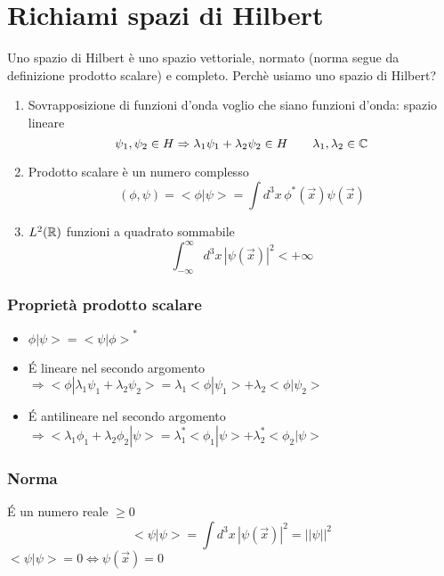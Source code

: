 \chapter{Richiami spazi di Hilbert}

Uno spazio di Hilbert è uno spazio vettoriale, normato (norma segue da definizione prodotto scalare) e completo. Perchè usiamo uno spazio di Hilbert?
\begin{enumerate}
    \item Sovrapposizione di funzioni d'onda voglio che siano funzioni d'onda: spazio lineare
    \begin{equation*}
        \psi_1,\psi_2 \in H \Rightarrow \lambda_1\psi_1 + \lambda_2\psi_2 \in H \qquad \lambda_1,\lambda_2 \in \mathbb{C} 
    \end{equation*}
    \item Prodotto scalare è un numero complesso
    \begin{equation*}
        (\phi,\psi) = <\phi | \psi> = \int d^3x \, \phi^*(\vec{x})\psi(\vec{x})
    \end{equation*}
    \item $L^2(\mathbb{R})$ funzioni a quadrato sommabile
    \begin{equation*}
        \int_{-\infty}^\infty d^3x \, {|\psi(\vec{x})|}^2 < +\infty
    \end{equation*}
\end{enumerate}

\subsection*{Proprietà prodotto scalare}

\begin{itemize}
    \item $\phi | \psi > = {<\psi | \phi >}^*$
    \item \'E lineare nel secondo argomento $\Rightarrow <\phi | \lambda_1\psi_1 + \lambda_2\psi_2> = \lambda_1 <\phi | \psi_1 > + \lambda_2 < \phi | \psi_2 >$
    \item \'E antilineare nel secondo argomento $\Rightarrow <\lambda_1 \phi_1 + \lambda_2 \phi_2 | \psi> = \lambda_1^*<\phi_1 | \psi> + \lambda_2^* <\phi_2 |\psi> $
\end{itemize}

\subsection*{Norma}
\'E un numero reale $\ge 0$ 
\begin{equation*}
    <\psi | \psi > = \int d^3x \, {|\psi(\vec{x})|}^2 = {||\psi||}^2 
\end{equation*}
$<\psi | \psi > = 0 \iff \psi(\vec{x})=0$

